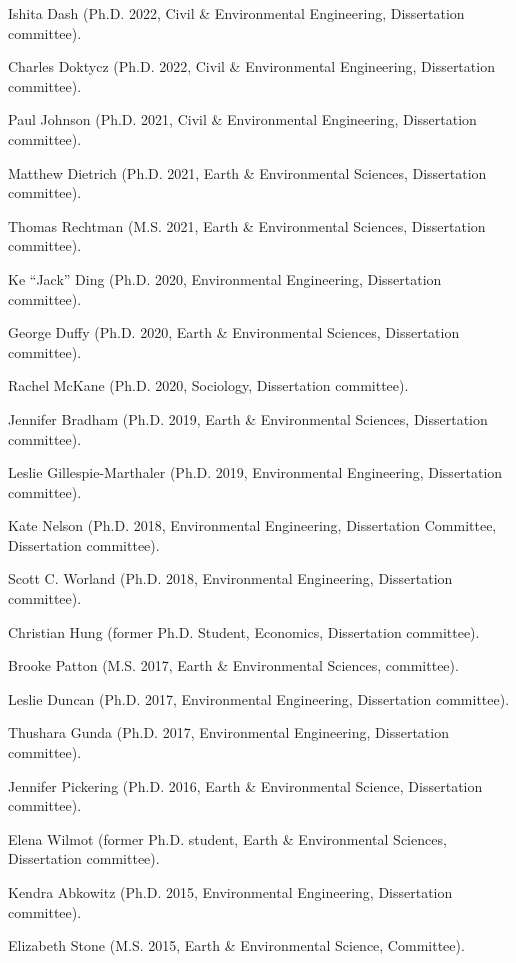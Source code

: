 \item Ishita Dash (Ph.D. 2022, Civil \& Environmental Engineering, Dissertation committee).
\item Charles Doktycz (Ph.D. 2022, Civil \& Environmental Engineering, Dissertation committee).
\item Paul Johnson (Ph.D. 2021, Civil \& Environmental Engineering, Dissertation committee).
\item Matthew Dietrich (Ph.D. 2021, Earth \& Environmental Sciences, Dissertation committee).
\item Thomas Rechtman (M.S. 2021, Earth \& Environmental Sciences, Dissertation committee).
\item Ke ``Jack'' Ding (Ph.D. 2020, Environmental Engineering, Dissertation committee).
\item George Duffy (Ph.D. 2020, Earth \& Environmental Sciences, Dissertation committee).
\item Rachel McKane (Ph.D. 2020, Sociology, Dissertation committee).
\item Jennifer Bradham (Ph.D. 2019, Earth \& Environmental Sciences, Dissertation committee).
\item Leslie Gillespie-Marthaler (Ph.D. 2019, Environmental Engineering, Dissertation committee).
\item Kate Nelson (Ph.D. 2018, Environmental Engineering, Dissertation Committee, Dissertation committee).
\item Scott C. Worland (Ph.D. 2018, Environmental Engineering, Dissertation committee).
\item Christian Hung (former Ph.D. Student, Economics, Dissertation committee).
\item Brooke Patton (M.S. 2017, Earth \& Environmental Sciences, committee).
\item Leslie Duncan (Ph.D. 2017, Environmental Engineering, Dissertation committee).
\item Thushara Gunda (Ph.D. 2017, Environmental Engineering, Dissertation committee).
\item Jennifer Pickering (Ph.D. 2016, Earth \& Environmental Science, Dissertation committee).
\item Elena Wilmot (former Ph.D. student, Earth \& Environmental Sciences, Dissertation committee).
\item Kendra Abkowitz (Ph.D. 2015, Environmental Engineering, Dissertation committee).
\item Elizabeth Stone (M.S. 2015, Earth \& Environmental Science, Committee).
